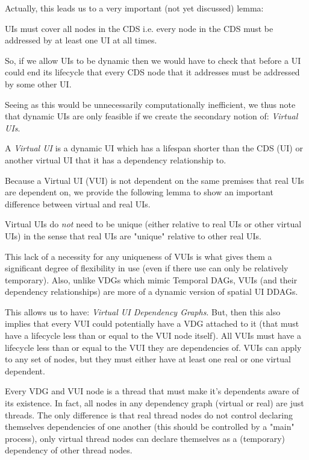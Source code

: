 Actually, this leads us to a very important (not yet discussed) lemma: 

\begin{con-lem}[]
	UIs must cover all nodes in the CDS i.e. every node in the CDS must be addressed by at least one UI at all times. 
\end{con-lem}

So, if we allow UIs to be dynamic then we would have to check that before a UI could end its lifecycle that every CDS node that it addresses must be addressed by some other UI. 

Seeing as this would be unnecessarily computationally inefficient, we thus note that dynamic UIs are only feasible if we create the secondary notion of: \textit{Virtual UIs}.

\begin{con-def}[Virtual UI]
	\label{virtual-ui}
	A \textit{Virtual UI} is a dynamic UI which has a lifespan shorter than the CDS (UI) or another virtual UI that it has a dependency relationship to.
\end{con-def}

Because a Virtual UI (VUI) is not dependent on the same premises that real UIs are dependent on, we provide the following lemma to show an important difference between virtual and real UIs.

\begin{con-lem}[]
	Virtual UIs do \textit{not} need to be unique  (either relative to real UIs or other virtual UIs) in the sense that real UIs are "unique" relative to other real UIs.
\end{con-lem}

This lack of a necessity for any uniqueness of VUIs is what gives them a significant degree of flexibility in use (even if there use can only be relatively temporary). Also, unlike VDGs which mimic Temporal DAGs, VUIs (and their dependency relationships) are more of a dynamic version of spatial UI DDAGs.

This allows us to have: \textit{Virtual UI Dependency Graphs}. But, then this also implies that every VUI could potentially have a VDG attached to it (that must have a lifecycle less than or equal to the VUI node itself). All VUIs must have a lifecycle less than or equal to the VUI they are dependencies of. VUIs can apply to any set of nodes, but they must either have at least one real or one virtual dependent.

Every VDG and VUI node is a thread that must make it's dependents aware of its existence. In fact, all nodes in any dependency graph (virtual or real) are just threads. The only difference is that real thread nodes do not control declaring themselves dependencies of one another (this should be controlled by a "main" process), only virtual thread nodes can declare themselves as a (temporary) dependency of other thread nodes.


